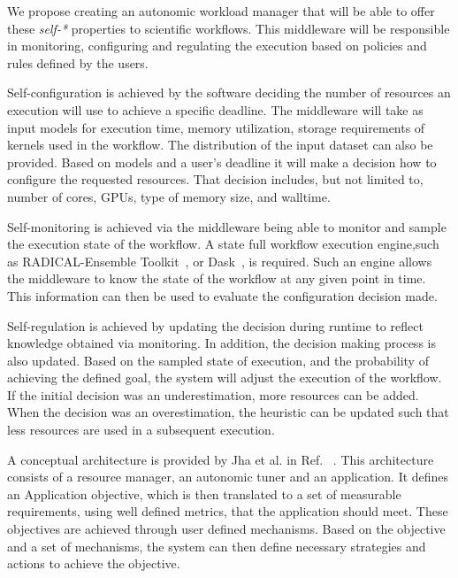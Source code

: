 We propose creating an autonomic workload manager that will be able to offer 
these \textit{self-*} properties to scientific workflows. This middleware 
will be responsible in monitoring, configuring and regulating the execution 
based on policies and rules defined by the users.

Self-configuration is achieved by the software deciding the number of 
resources an execution will use to achieve a specific deadline. The 
middleware will take as input models for execution time, memory utilization, 
storage requirements of kernels used in the workflow. The distribution of the 
input dataset can also be provided. Based on models and a user's deadline it 
will make a decision how to configure the requested resources. That decision 
includes, but not limited to, number of cores, GPUs, type of memory size, and 
walltime.

Self-monitoring is achieved via the middleware being able to monitor and 
sample the execution state of the workflow. A state full workflow execution 
engine,such as RADICAL-Ensemble Toolkit~\cite{balasubramanian2018harnessing}, 
or Dask~\cite{rocklin2015dask}, is required. Such an engine allows the 
middleware to know the state of the workflow at any given point in time. This 
information can then be used to evaluate the configuration decision made.

Self-regulation is achieved by updating the decision during runtime to 
reflect knowledge obtained via monitoring. In addition, the decision making 
process is also updated. Based on the sampled state of execution, and the 
probability of achieving the defined goal, the system will adjust the 
execution of the workflow. If the initial decision was an underestimation, 
more resources can be added. When the decision was an overestimation, the 
heuristic can be updated such that less resources are used in a subsequent 
execution.


A conceptual architecture is provided by Jha et al. in Ref.~\cite{jha2009self}
. This architecture consists of a resource manager, an autonomic tuner and an 
application. It defines an Application objective, which is then translated to 
a set of measurable requirements, using well defined metrics, that the 
application should meet. These objectives are achieved through user defined 
mechanisms. Based on the objective and a set of mechanisms, the system can 
then define necessary strategies and actions to achieve the objective.

